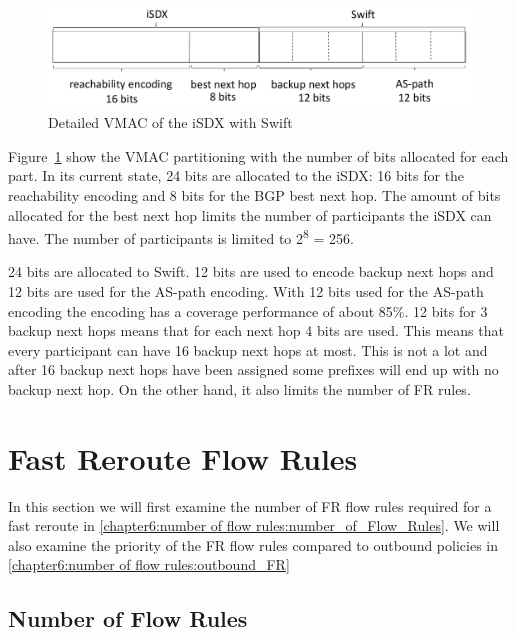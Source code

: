 \begin{figure}[h]
\center
\includegraphics[scale = 0.65]{Figures/eval_vmac2_cropped.pdf}
\caption{Detailed VMAC of the iSDX with Swift}
\label{fig:discussion_VMAC}
\end{figure}

Figure~\ref{fig:discussion_VMAC} show the VMAC partitioning with the number of bits allocated for each part. 
In its current state, 24 bits are allocated to the iSDX: 16 bits for the reachability encoding and 8 bits for the BGP best next hop. 
The amount of bits allocated for the best next hop limits the number of participants the iSDX can have. The number of participants is limited to 2\textsuperscript{8} = 256.

24 bits are allocated to Swift. 12 bits are used to encode backup next hops and 12 bits are used for the AS-path encoding. 
With 12 bits used for the AS-path encoding the encoding has a coverage performance of about 85\%. \cite{swift}
12 bits for 3 backup next hops means that for each next hop 4 bits are used. This means that every participant can have 16 backup next hops at most. This is not a lot and after 16 backup next hops have been assigned some prefixes will end up with no backup next hop. On the other hand, it also limits the number of FR rules.

\section{\label{chapter6:number of flow rules}Fast Reroute Flow Rules}

In this section we will first examine the number of FR flow rules required for a fast reroute in \ref{chapter6:number of flow rules:number_of_Flow_Rules}. We will also examine the priority of the FR flow rules compared to outbound policies in \ref{chapter6:number of flow rules:outbound_FR}

\subsection{\label{chapter6:number of flow rules:number_of_Flow_Rules}Number of Flow Rules}

